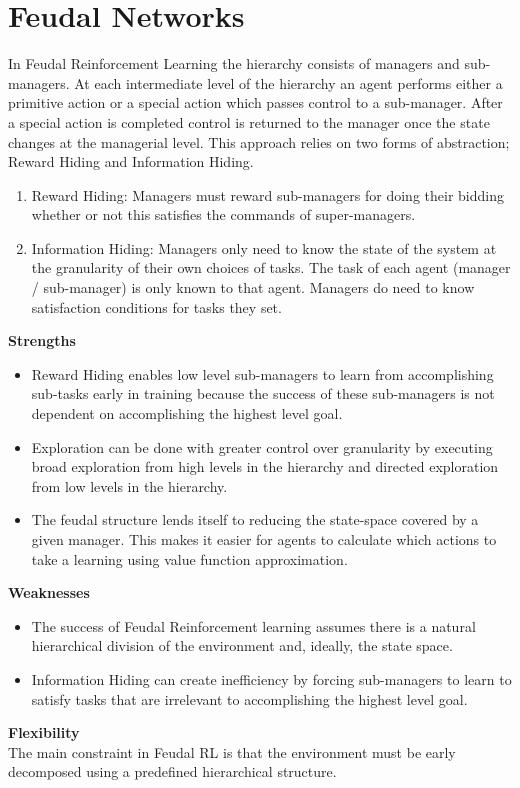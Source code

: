 \section{Feudal Networks}

In Feudal Reinforcement Learning the hierarchy consists
of managers and sub-managers. At each intermediate level of the hierarchy an agent performs
either a primitive action or
a special action which passes control to a sub-manager. After a special action
is completed control is
returned to the manager once the state changes at the managerial level. This
approach relies on two
forms of abstraction; Reward Hiding and Information Hiding. \cite{Dayan}

\begin{enumerate}
    \item Reward Hiding: Managers must reward sub-managers for doing their bidding whether or not this
          satisfies the commands of super-managers.
    \item Information Hiding: Managers only need to know the state of the system at the granularity of
          their own choices of tasks. The task of each agent (manager / sub-manager) is only known to that
          agent. Managers do need to know satisfaction conditions for tasks they set.
\end{enumerate}

\textbf{Strengths}
\begin{itemize}
    \item Reward Hiding enables low level sub-managers to learn from accomplishing sub-tasks early in training
          because the success of these sub-managers is not dependent on accomplishing the highest level goal.
    \item Exploration can be done with greater control over granularity by executing broad exploration from high levels
          in the hierarchy and directed exploration from low levels in the hierarchy.
    \item The feudal structure lends itself to reducing the state-space covered by a given manager.
          This makes it easier for agents to calculate which actions to take a learning using value function approximation.
\end{itemize}

\textbf{Weaknesses}
\begin{itemize}
    \item The success of Feudal Reinforcement learning assumes there is a natural hierarchical division of the environment
          and, ideally, the state space.
    \item Information Hiding can create inefficiency by forcing sub-managers to learn to satisfy tasks that are irrelevant to
          accomplishing the highest level goal.
\end{itemize}

\textbf{Flexibility} \\
The main constraint in Feudal RL is that the environment must be early
decomposed using a predefined hierarchical structure.

